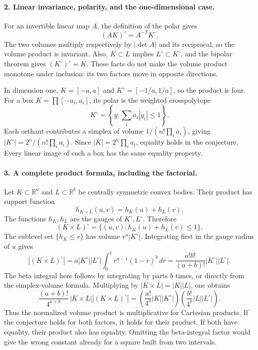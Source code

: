 \documentclass[11pt]{article}
\begin{document}
\paragraph{2. Linear invariance, polarity, and the one-dimensional case.}
For an invertible linear map $A$, the definition of the polar gives
\[
 (AK)^\circ=A^{-T}K^\circ.
\]
The two volumes multiply respectively by $|\det A|$ and its reciprocal, so the volume product is invariant. Also, $K\subset L$ implies $L^\circ\subset K^\circ$, and the bipolar theorem gives $(K^\circ)^\circ=K$. These facts do not make the volume product monotone under inclusion: its two factors move in opposite directions.

In dimension one, $K=[-a,a]$ and $K^\circ=[-1/a,1/a]$, so the product is four. For a box $K=\prod[-a_i,a_i]$, its polar is the weighted crosspolytope
\[
 K^\circ=\left\{y:\sum_i a_i|y_i|\leq1\right\}.
\]
Each orthant contributes a simplex of volume $1/(n!\prod_i a_i)$, giving $|K^\circ|=2^n/(n!\prod_i a_i)$. Since $|K|=2^n\prod_i a_i$, equality holds in the conjecture. Every linear image of such a box has the same equality property.

\paragraph{3. A complete product formula, including the factorial.}
Let $K\subset\mathbb R^a$ and $L\subset\mathbb R^b$ be centrally symmetric convex bodies. Their product has support function
\[
 h_{K\times L}(u,v)=h_K(u)+h_L(v).
\]
The functions $h_K,h_L$ are the gauges of $K^\circ,L^\circ$. Therefore
\[
 (K\times L)^\circ=\{(u,v):h_K(u)+h_L(v)\leq1\}.
\]
The sublevel set $\{h_K\leq r\}$ has volume $r^a|K^\circ|$. Integrating first in the gauge radius of $u$ gives
\[
 |(K\times L)^\circ|
 =a|K^\circ||L^\circ|\int_0^1r^{a-1}(1-r)^b\,dr
 =\frac{a!b!}{(a+b)!}|K^\circ||L^\circ|.
\]
The beta integral here follows by integrating by parts $b$ times, or directly from the simplex-volume formula. Multiplying by $|K\times L|=|K||L|$, one obtains
\[
 \frac{(a+b)!}{4^{a+b}}\,|K\times L||(K\times L)^\circ|
 =\left(\frac{a!}{4^a}|K||K^\circ|\right)
  \left(\frac{b!}{4^b}|L||L^\circ|\right).
\]
Thus the normalized volume product is multiplicative for Cartesian products. If the conjecture holds for both factors, it holds for their product. If both have equality, their product also has equality. Omitting the beta-integral factor would give the wrong constant already for a square built from two intervals.
\end{document}
